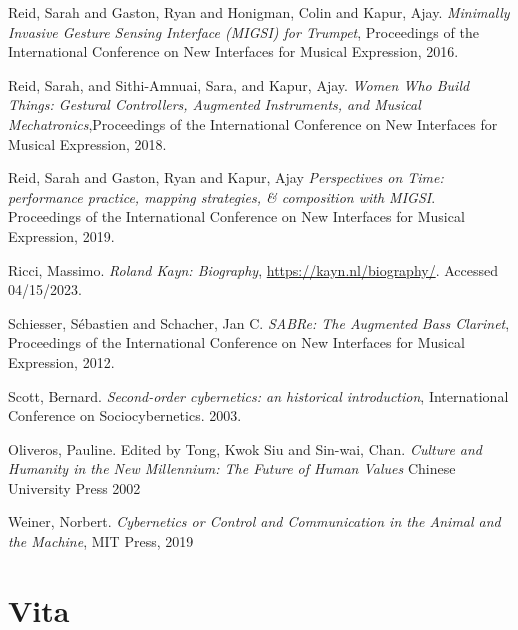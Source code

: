 \begin{thebibliography}{99}
 Reid, Sarah and Gaston, Ryan and Honigman, Colin and Kapur, Ajay. \emph{Minimally Invasive Gesture Sensing Interface (MIGSI) for Trumpet}, Proceedings of the International Conference on New Interfaces for Musical Expression, 2016.

 Reid, Sarah, and Sithi-Amnuai, Sara, and Kapur, Ajay. \emph{Women Who Build Things: Gestural Controllers, Augmented Instruments, and Musical Mechatronics},Proceedings of the International Conference on New Interfaces for Musical Expression, 2018.

 Reid, Sarah and Gaston, Ryan and Kapur, Ajay \emph{Perspectives on Time: performance practice, mapping strategies, \& composition with MIGSI}. Proceedings of the International Conference on New Interfaces for Musical Expression, 2019.

 Ricci, Massimo. \emph{Roland Kayn: Biography}, \url{https://kayn.nl/biography/}. Accessed 04/15/2023.

 Schiesser, S{\'e}bastien and Schacher, Jan C. \emph{SABRe: The Augmented Bass Clarinet}, Proceedings of the International Conference on New Interfaces for Musical Expression, 2012.

 Scott, Bernard. \emph{Second-order cybernetics: an historical introduction}, International Conference on Sociocybernetics. 2003.

 Oliveros, Pauline. Edited by Tong, Kwok Siu and Sin-wai, Chan. \emph{Culture and Humanity in the New Millennium: The Future of Human Values} Chinese University Press 2002

 Weiner, Norbert. \emph{Cybernetics or Control and Communication in the Animal and the Machine}, MIT Press, 2019




\end{thebibliography}


\chapter{Vita}

